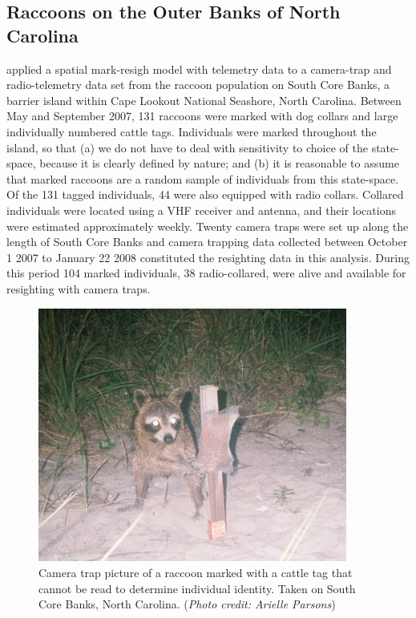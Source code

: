 \subsection{Raccoons on the Outer Banks of North Carolina}

\citet{sollmann_etal:2012ecol} applied a spatial mark-resigh model with telemetry data to a camera-trap and radio-telemetry data set from the raccoon population on South Core Banks, a barrier island within Cape Lookout National Seashore, North Carolina. Between May and September 2007, 131 raccoons were marked with dog collars and large individually numbered cattle tags. Individuals were marked throughout the island, so that (a) we do not have to deal with sensitivity to choice of the state-space, because it is clearly defined by nature; and (b) it is reasonable to assume that marked raccoons are a random sample of individuals from this state-space.
Of the 131 tagged individuals, 44  were also equipped with radio collars. Collared individuals were located using a VHF receiver and antenna, and their locations were estimated approximately weekly. Twenty camera traps  were set up along the length of South Core Banks and camera trapping data collected between October 1 2007 to January 22 2008 constituted the resighting data in this analysis. During this period 104 marked individuals, 38 radio-collared, were alive and available for resighting with camera traps.

\begin{figure}[ht]
  \centering
  \includegraphics[width=4in]{Ch19-PartialID/figs/Raccoon_pic.png}
  \caption{Camera trap picture of a raccoon marked with a cattle tag that cannot be read to determine individual identity. Taken on South Core Banks, North Carolina.
({\it Photo credit: Arielle Parsons})}
  \label{partialID.fig.raccoon}
\end{figure}

